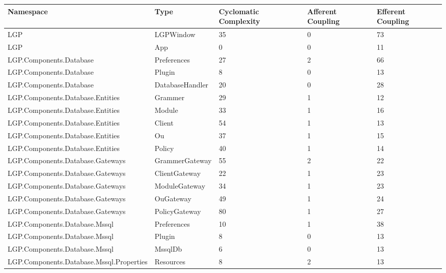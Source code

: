 			\begin{table}[h!t]
				\footnotesize{\begin{tabular}{ | p{82mm} | p{32mm} | p{10mm} | p{10mm} | p{10mm} | }	
																						\hline
				Namespace & Type  & Cyclomatic Complexity & Afferent Coupling & Efferent Coupling  \\ \hline
				LGP   & LGPWindow & 35    & 0     & \cellcolor{ored}73  \\ \hline
				LGP   & App   & 0     & 0     & 11  \\ \hline
				LGP.Components.Database & Preferences & 27    & 2     & \cellcolor{ored}66  \\ \hline
				LGP.Components.Database & Plugin & 8     & 0     & 13  \\ \hline
				LGP.Components.Database & DatabaseHandler & 20    & 0     & 28  \\ \hline
				LGP.Components.Database.Entities & Grammer & 29    & 1     & 12  \\ \hline
				LGP.Components.Database.Entities & Module & 33    & 1     & 16  \\ \hline
				LGP.Components.Database.Entities & Client & \cellcolor{ored}54    & 1     & 13  \\ \hline
				LGP.Components.Database.Entities & Ou    & 37    & 1     & 15  \\ \hline
				LGP.Components.Database.Entities & Policy & 40    & 1     & 14  \\ \hline
				LGP.Components.Database.Gateways & GrammerGateway & \cellcolor{ored}55    & 2     & 22  \\ \hline
				LGP.Components.Database.Gateways & ClientGateway & 22    & 1     & 23  \\ \hline
				LGP.Components.Database.Gateways & ModuleGateway & 34    & 1     & 23  \\ \hline
				LGP.Components.Database.Gateways & OuGateway & \cellcolor{ored}49    & 1     & 24  \\ \hline
				LGP.Components.Database.Gateways & PolicyGateway & \cellcolor{ored}80    & 1     & 27  \\ \hline
				LGP.Components.Database.Mssql & Preferences & 10    & 1     & 38  \\ \hline
				LGP.Components.Database.Mssql & Plugin & 8     & 0     & 13  \\ \hline
				LGP.Components.Database.Mssql & MssqlDb & 6     & 0     & 13  \\ \hline
				LGP.Components.Database.Mssql.Properties & Resources & 8     & 2     & 13  \\ \hline

\end{tabular}}
\end{table}

